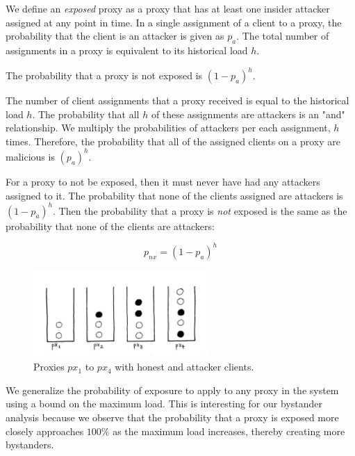 We define an \textit{exposed} proxy as a proxy that has at least one insider attacker assigned at any point in time. In a single assignment of a client to a proxy, the probability that the client is an attacker is given as $p_a$. The total number of assignments in a proxy is equivalent to its historical load $h$. 

\begin{lemma}{The probability that a proxy is not exposed is $(1-p_a)^{h}$.}

The number of client assignments that a proxy received is equal to the historical load $h$. The probability that all $h$ of these assignments are attackers is an "and" relationship. We multiply the probabilities of attackers per each assignment, $h$ times. Therefore, the probability that all of the assigned clients on a proxy are malicious is $(p_a)^h$. 

For a proxy to not be exposed, then it must never have had any attackers assigned to it. The probability that none of the clients assigned are attackers is $(1-p_a)^h$. Then the probability that a proxy is \textit{not} exposed is the same as the probability that none of the clients are attackers:

$$p_{nx} = (1-p_a)^h$$

\end{lemma}

\begin{figure}[h!]
\centering
     \includegraphics[width=0.6\textwidth]{fig/proxy_examples.png}
    \caption{Proxies $px_1$ to $px_4$ with honest and attacker clients.}

    \label{fig:bystandersdraw}
\end{figure}

We generalize the probability of exposure to apply to any proxy in the system using a bound on the maximum load. This is interesting for our bystander analysis because we observe that the probability that a proxy is exposed more closely approaches $100\%$ as the maximum load increases, thereby creating more bystanders.


